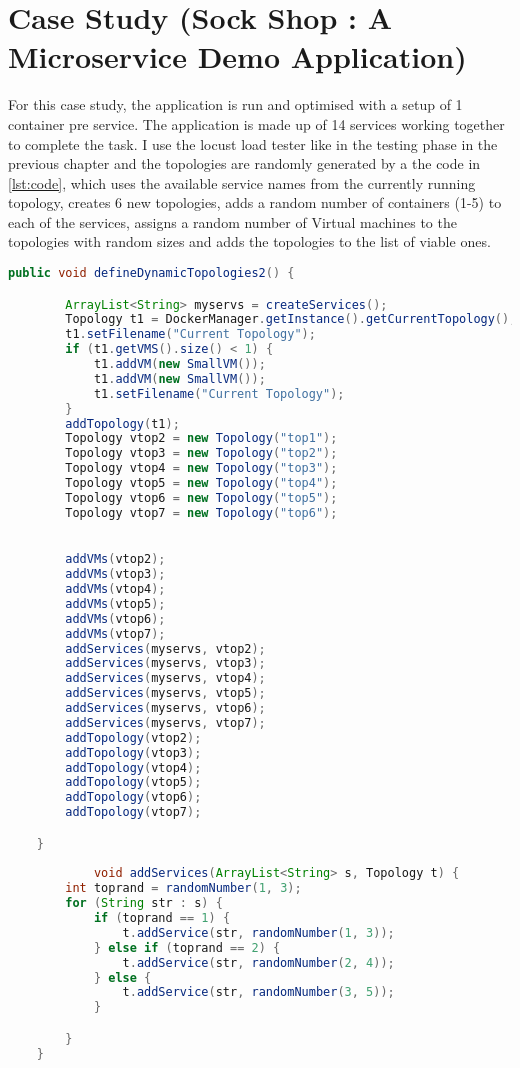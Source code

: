 \section{Case Study (Sock Shop : A Microservice Demo Application)}
For this case study, the application is run and optimised with a setup of 1 container pre service. The application is made up of 14 services working together to complete the task. I use the locust load tester like in the testing phase in the previous chapter and the topologies are randomly generated by a the code in \autoref{lst:code}, which uses the available service names from the currently running topology, creates 6 new topologies, adds a random number of containers (1-5) to each of the services, assigns a random number of Virtual machines to the topologies with random sizes and adds the topologies to the list of viable ones.

\begin{lstlisting}[language=Java, caption=Viable Topology definition code, label= lst:code]
		public void defineDynamicTopologies2() {

		ArrayList<String> myservs = createServices();
		Topology t1 = DockerManager.getInstance().getCurrentTopology();
		t1.setFilename("Current Topology");
		if (t1.getVMS().size() < 1) {
			t1.addVM(new SmallVM());
			t1.addVM(new SmallVM());
			t1.setFilename("Current Topology");
		}
		addTopology(t1);
		Topology vtop2 = new Topology("top1");
		Topology vtop3 = new Topology("top2");
		Topology vtop4 = new Topology("top3");
		Topology vtop5 = new Topology("top4");
		Topology vtop6 = new Topology("top5");
		Topology vtop7 = new Topology("top6");
		

		addVMs(vtop2);
		addVMs(vtop3);
		addVMs(vtop4);
		addVMs(vtop5);
		addVMs(vtop6);
		addVMs(vtop7);
		addServices(myservs, vtop2);
		addServices(myservs, vtop3);
		addServices(myservs, vtop4);
		addServices(myservs, vtop5);
		addServices(myservs, vtop6);
		addServices(myservs, vtop7);
		addTopology(vtop2);
		addTopology(vtop3);
		addTopology(vtop4);
		addTopology(vtop5);
		addTopology(vtop6);
		addTopology(vtop7);

	}
	
			void addServices(ArrayList<String> s, Topology t) {
		int toprand = randomNumber(1, 3);
		for (String str : s) {
			if (toprand == 1) {
				t.addService(str, randomNumber(1, 3));
			} else if (toprand == 2) {
				t.addService(str, randomNumber(2, 4));
			} else {
				t.addService(str, randomNumber(3, 5));
			}

		}
	}	
\end{lstlisting}

